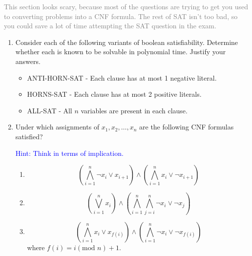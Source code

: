 \documentclass[a4paper, 12pt]{article}
\begin{document}
{ \textcolor{gray}{This section looks scary, 
because most of the questions are trying to get you used to converting problems into a CNF formula.
The rest of SAT isn't too bad, so you could save a lot of time attempting the SAT question in the exam.
}}

\begin{enumerate}

\item Consider each of the following variants of boolean satisfiability. 
Determine whether each is known to be solvable in polynomial time. Justify your answers.
\begin{itemize}
    \item ANTI-HORN-SAT - Each clause has at most 1 negative literal.
    \item HORNS-SAT - Each clause has at most 2 positive literals.
    \item ALL-SAT - All $n$ variables are present in each clause.
\end{itemize}

\item
Under which assignments of $x_1, x_2, \dots, x_n$ are the following CNF formulas satisfied?

{ \small \textcolor{blue}{Hint: Think in terms of implication.} }
\begin{enumerate}
    \item 
    \begin{equation*}
        \left(\bigwedge_{i=1}^{n} \neg x_i \vee x_{i+1}\right) \wedge \left(\bigwedge_{i=1}^{n} x_i \vee \neg x_{i+1}\right)
    \end{equation*}
    \item
    \begin{equation*}
        \left(\bigvee_{i=1}^{n} x_i \right) \wedge \left( \bigwedge_{i=1}^{n}\bigwedge_{j=i}^{n} \neg x_i \vee \neg x_j \right)
    \end{equation*}
    \item 
    \begin{equation*}
        \left(\bigwedge_{i=1}^{n} x_i \vee x_{f(i)}\right) \wedge \left(\bigwedge_{i=1}^{n} \neg x_i \vee \neg x_{f(i)}\right)
    \end{equation*}
    where $f(i) = i (\text{mod } n) + 1$.
\end{enumerate}



\end{enumerate}
\end{document}
